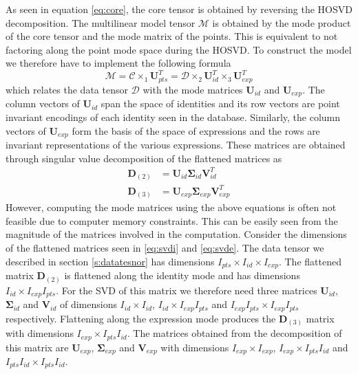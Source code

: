 \documentclass[11pt,a4paper]{report}
\begin{document}
As seen in equation \ref{eq:core}, the core tensor is obtained by reversing
the HOSVD decomposition. The multilinear model tensor $\mathcal{M}$ is obtained
by the mode product of the core tensor and the mode matrix of the points. This
is equivalent to not factoring along the point mode space during the HOSVD.
To construct the model we therefore have to implement the following formula
\begin{equation}\label{eq:model}
\mathcal{M} = \mathcal{C} \times_1 \mathbf{U}_{pts}^T = \mathcal{D} \times_2
\mathbf{U}_{id}^T \times_3 \mathbf{U}_{exp}^T
\end{equation}
which relates the data tensor $\mathcal{D}$ with the mode matrices $\mathbf{U}_{id}$
and $\mathbf{U}_{exp}$. The column vectors of $\mathbf{U}_{id}$ span the space
of identities and its row vectors are point invariant
encodings of each identity seen in the database. Similarly, the column
vectors of $\mathbf{U}_{exp}$ form the basis of the space of expressions and the
rows are invariant representations of the various expressions. These matrices
are obtained through singular value decomposition of the flattened
matrices as
\begin{align}\label{eq:svdi}
\mathbf{D}_{(2)} &= \mathbf{U}_{id} \mathbf{\Sigma}_{id} \mathbf{V}_{id}^T\\
\label{eq:svde}
\mathbf{D}_{(3)} &= \mathbf{U}_{exp} \mathbf{\Sigma}_{exp} \mathbf{V}_{exp}^T
\end{align}
However, computing the mode matrices using the above equations is often not
feasible due to computer memory constraints. This can be easily seen from the magnitude of the matrices
involved in the computation. Consider the dimensions of the flattened
matrices seen in \ref{eq:svdi} and \ref{eq:svde}. The data tensor we described
in section \ref{s:datatesnor} has
dimensions $I_{pts} \times I_{id} \times I_{exp}$. The flattened matrix
$\mathbf{D}_{(2)}$ is flattened along the identity mode and has dimensions
$I_{id} \times I_{exp}I_{pts}$. For the SVD of this matrix we therefore need
three matrices $\mathbf{U}_{id}$, $\mathbf{\Sigma}_{id}$ and $\mathbf{V}_{id}$
of dimensions $I_{id} \times I_{id}$, $I_{id} \times I_{exp}I_{pts}$ and
$I_{exp}I_{pts} \times I_{exp}I_{pts}$ respectively. Flattening along the expression mode produces
the $\mathbf{D}_{(3)}$ matrix with dimensions $I_{exp} \times
I_{pts}I_{id}$. The matrices obtained from the decomposition of this matrix are
$\mathbf{U}_{exp}$, $\mathbf{\Sigma}_{exp}$ and $\mathbf{V}_{exp}$ with
dimensions $I_{exp} \times I_{exp}$, $I_{exp} \times I_{pts}I_{id}$ and
$I_{pts}I_{id} \times I_{pts}I_{id}$.
\end{document}

